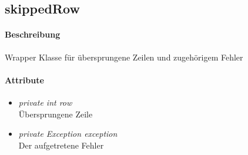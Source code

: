 \subsection{skippedRow}

\paragraph{Beschreibung}
Wrapper Klasse für übersprungene Zeilen und zugehörigem Fehler


\paragraph{Attribute}

\begin{itemize}
	
\item \textit{private int row} \\ Übersprungene Zeile

\item \textit{private Exception exception} \\ Der aufgetretene Fehler

\end{itemize}
